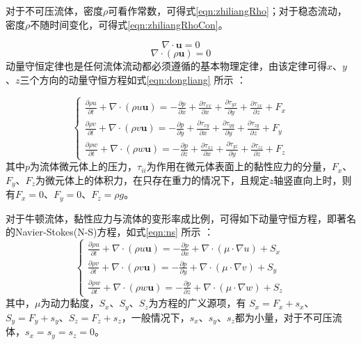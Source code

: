 对于不可压流体，密度$\rho$可看作常数，可得式\ref{eqn:zhiliangRho}；对于稳态流动，密度$\rho$不随时间变化，可得式\ref{eqn:zhiliangRhoCon}。

	\begin{equation}
		\label{eqn:zhiliangRho}
		\nabla \cdot \mathbf{u} =0
	\end{equation}
	\begin{equation}
		\label{eqn:zhiliangRhoCon}
		\nabla \cdot (\rho \mathbf{u}) =0
	\end{equation}
动量守恒定律也是任何流体流动都必须遵循的基本物理定律，由该定律可得$x$、$y$、$z$三个方向的动量守恒方程如式\ref{eqn:dongliang} 所示\supercite{ComsolCfd2015,WangFujun2004} ：

	\begin{equation}
		\label{eqn:dongliang}
		\left\{
		\begin{aligned}
		\frac{\partial \rho u}{\partial t}+\nabla \cdot (\rho u \mathbf{u}) = - \frac{\partial p}{\partial x}+\frac{\partial \tau_{xx}}{\partial x}+\frac{\partial \tau_{yx}}{\partial y}+\frac{\partial \tau_{zx}}{\partial z} + F_x \\
		\frac{\partial \rho v}{\partial t}+\nabla \cdot (\rho v \mathbf{u}) = - \frac{\partial p}{\partial y}+\frac{\partial \tau_{xy}}{\partial x}+\frac{\partial \tau_{yy}}{\partial y}+\frac{\partial \tau_{zy}}{\partial z} + F_y \\
		\frac{\partial \rho w}{\partial t}+\nabla \cdot (\rho w \mathbf{u}) = - \frac{\partial p}{\partial z}+\frac{\partial \tau_{xz}}{\partial x}+\frac{\partial \tau_{yz}}{\partial y}+\frac{\partial \tau_{zz}}{\partial z} + F_z 
		\end{aligned}
		\right.
	\end{equation}
其中$p$为流体微元体上的压力，$\tau_{ii}$为作用在微元体表面上的黏性应力的分量，$F_x$、$F_y$、$F_z$为微元体上的体积力，在只存在重力的情况下，且规定$z$轴竖直向上时，则有$F_x=0$、$F_y=0$、$F_z=\rho g$。

对于牛顿流体，黏性应力与流体的变形率成比例，可得如下动量守恒方程，即著名的Navier-Stokes(N-S)方程，如式\ref{eqn:ns} 所示\supercite{WangFujun2004} ：
	\begin{equation}
		\label{eqn:ns}
		\left\{
		\begin{aligned}
		\frac{\partial \rho u}{\partial t}+\nabla \cdot (\rho u \mathbf{u}) =- \frac{\partial p}{\partial x}+\nabla \cdot (\mu \cdot \nabla u ) + S_x \\
		\frac{\partial \rho v}{\partial t}+\nabla \cdot (\rho v \mathbf{u}) =- \frac{\partial p}{\partial y}+\nabla \cdot (\mu \cdot \nabla v ) + S_y \\
		\frac{\partial \rho w}{\partial t}+\nabla \cdot (\rho w \mathbf{u}) =- \frac{\partial p}{\partial z}+\nabla \cdot (\mu \cdot \nabla w ) + S_z 
		\end{aligned}
		\right.
	\end{equation}
其中，$\mu$为动力黏度，$S_x$、$S_y$、$S_z$为方程的广义源项，有 $S_x=F_x+s_x$、$S_y=F_y+s_y$、$S_z=F_z+s_z$，一般情况下，$s_x$、$s_y$、$s_z$都为小量，对于不可压流体，$s_x=s_y=s_z=0$。

